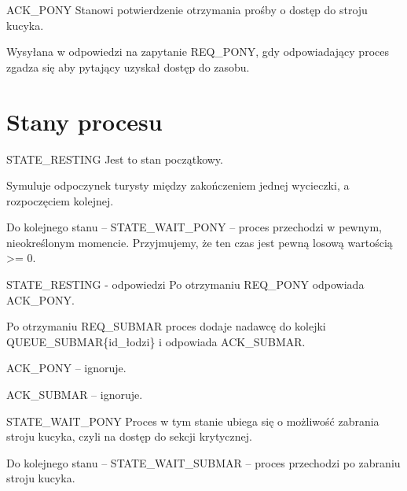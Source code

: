 \documentclass{beamer}
\begin{document}
\begin{frame}{ACK\_PONY}
    \internallinenumbers
    \resetlinenumber[1]
    Stanowi potwierdzenie otrzymania prośby o dostęp do stroju kucyka.

    \vspace{1cm}
    Wysyłana w odpowiedzi na zapytanie REQ\_PONY, gdy odpowiadający proces zgadza się aby pytający uzyskał dostęp do zasobu.
\end{frame}

\section{Stany procesu}
\begin{frame}{STATE\_RESTING}
    \internallinenumbers
    \resetlinenumber[1]
    Jest to stan początkowy.

    \vspace{1cm}
    Symuluje odpoczynek turysty między zakończeniem jednej wycieczki, a rozpoczęciem kolejnej.

    \vspace{1cm}
    Do kolejnego stanu – STATE\_WAIT\_PONY – proces przechodzi w pewnym, nieokreślonym momencie. Przyjmujemy, że ten czas jest pewną losową wartością >= 0.
\end{frame}

\begin{frame}{STATE\_RESTING - odpowiedzi}
    \internallinenumbers
    \resetlinenumber[1]
    Po otrzymaniu REQ\_PONY odpowiada ACK\_PONY.

    \vspace{1cm}
    Po otrzymaniu REQ\_SUBMAR proces dodaje nadawcę do kolejki QUEUE\_SUBMAR\{id\_łodzi\} i odpowiada ACK\_SUBMAR.

    \vspace{1cm}
    ACK\_PONY – ignoruje.

    \vspace{1cm}
    ACK\_SUBMAR – ignoruje.
\end{frame}

\begin{frame}{STATE\_WAIT\_PONY}
    \internallinenumbers
    \resetlinenumber[1]
    Proces w tym stanie ubiega się o  możliwość zabrania stroju kucyka, czyli na dostęp do sekcji krytycznej.

    \vspace{1cm}
    Do kolejnego stanu – STATE\_WAIT\_SUBMAR – proces przechodzi po zabraniu stroju kucyka.    
\end{frame}
\end{document}
